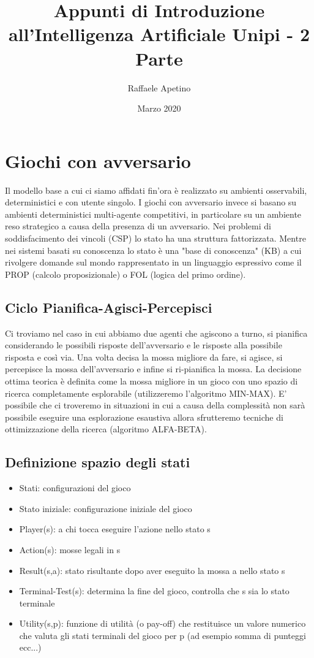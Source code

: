 \documentclass{article}
\title{Appunti di Introduzione all'Intelligenza Artificiale Unipi - 2 Parte}
\author{Raffaele Apetino}
\date{Marzo 2020}
\begin{document}
\maketitle

\tableofcontents{}
\clearpage

\section{Giochi con avversario}
Il modello base a cui ci siamo affidati fin'ora è realizzato su ambienti osservabili, deterministici e con utente singolo. I giochi con avversario invece si basano su ambienti deterministici multi-agente competitivi, in particolare su un ambiente reso strategico a causa della presenza di un avversario. Nei problemi di soddisfacimento dei vincoli (CSP) lo stato ha una struttura fattorizzata. Mentre nei sistemi basati su conoscenza lo stato è una "base di conoscenza" (KB) a cui rivolgere domande sul mondo rappresentato in un linguaggio espressivo come il PROP (calcolo proposizionale) o FOL (logica del primo ordine). 

\subsection{Ciclo Pianifica-Agisci-Percepisci}
Ci troviamo nel caso in cui abbiamo due agenti che agiscono a turno, si pianifica considerando le possibili risposte dell'avversario e le risposte alla possibile risposta e così via. Una volta decisa la mossa migliore da fare, si agisce, si percepisce la mossa dell'avversario e infine si ri-pianifica la mossa. La decisione ottima teorica è definita come la mossa migliore in un gioco con uno spazio di ricerca completamente esplorabile (utilizzeremo l'algoritmo MIN-MAX). E' possibile che ci troveremo in situazioni in cui a causa della complessità non sarà possibile eseguire una esplorazione esaustiva allora sfrutteremo tecniche di ottimizzazione della ricerca (algoritmo ALFA-BETA).

\subsection{Definizione spazio degli stati}
\begin{itemize}
    \item Stati: configurazioni del gioco
    \item Stato iniziale: configurazione iniziale del gioco
    \item Player(s): a chi tocca eseguire l'azione nello stato s
    \item Action(s): mosse legali in s
    \item Result(s,a): stato risultante dopo aver eseguito la mossa a nello stato s
    \item Terminal-Test(s): determina la fine del gioco, controlla che s sia lo stato terminale
    \item Utility(s,p): funzione di utilità (o pay-off) che restituisce un valore numerico che valuta gli stati terminali del gioco per p (ad esempio somma di punteggi ecc...)
\end{itemize}
\newpage
\end{document}
